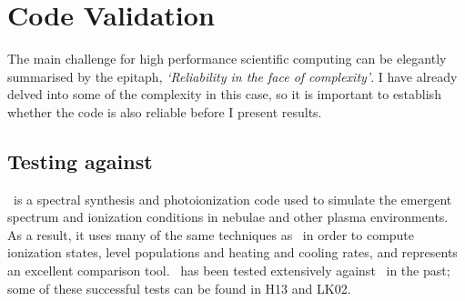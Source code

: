 




\section{Code Validation}
\label{sec:code_validation}

The main challenge for high performance scientific computing can be 
elegantly summarised by the \cite{ferland2002} epitaph, {\sl `Reliability in the face 
of complexity'}. I have already delved into some of the complexity in this case,
so it is important to establish whether the code is also reliable before I present
results. 

\subsection{Testing against \cld}

\cld\ is a spectral synthesis and photoionization code used to simulate
the emergent spectrum and ionization conditions in nebulae and other plasma
environments. As a result, it uses many of the same techniques as \py\
in order to compute ionization states, level populations and heating and cooling
rates, and represents an excellent comparison tool. \py\ has been tested extensively
against \cld\ in the past; some of these successful
tests can be found in H13 and LK02.

